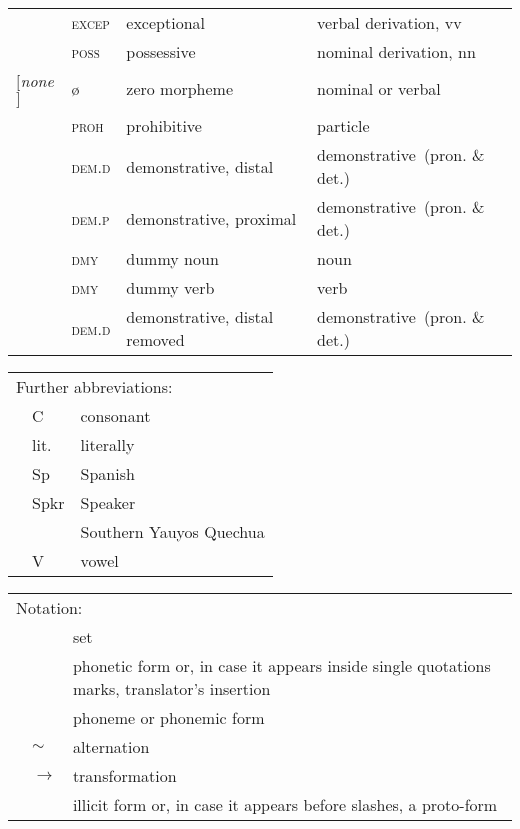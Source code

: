 \begin{refsection}
\begin{small}
\begin{longtable}{*{4}{@{\hspace{0.75ex}}l}@{\hspace{0ex}}}
 		& \textsc{excep} 	& exceptional 	& verbal derivation, vv\\
 		& \textsc{poss} 	& possessive 	& nominal derivation, nn\\
$[$\textit{none}$]$ 		& \o 			& zero morpheme 	& nominal or verbal\\
 		& \textsc{proh} 	& prohibitive 	& particle\\
 		& \textsc{dem.d} 	& demonstrative, distal 	& demonstrative~(pron. \&{} det.)\\
		& \textsc{dem.p} 	& demonstrative, proximal 	& demonstrative~(pron. \&{} det.) \\
		& \textsc{dmy} 	& dummy noun 	& noun\\
		& \textsc{dmy} 	& dummy verb 	& verb\\
		& \textsc{dem.d} 	& demonstrative, distal removed 	& demonstrative~(pron. \&{} det.)\\
\end{longtable}
\end{small}

\begin{small}
\begin{tabular}{p{\parindent}lp{}}
\multicolumn{3}{l}{Further abbreviations:}\\[1ex]
&C	&consonant		\\  
&lit. 	&literally		\\
&Sp	&Spanish		\\
&Spkr	&Speaker		\\
&\SYQ{} 	&Southern Yauyos Quechua\\
&V	&vowel			\\
\end{tabular}
\end{small}

\begin{small}
\begin{tabular}{p{\parindent}lp{}}
\multicolumn{3}{l}{Notation:}\\[1ex]
&\textipa{\{\textperiodcentered\}} 	& set\\
&\textipa{[{\textperiodcentered}]}	& phonetic form or, in case it appears inside single quotations marks, translator's insertion\\
&\textipa{/\textperiodcentered/}	& phoneme or phonemic form\\
&$\sim$ 				& alternation\\
&$\rightarrow $			& transformation\\
&\textipa{*}			& illicit form or, in case it appears before slashes, a proto-form\\
\end{tabular}
\end{small}



\end{refsection}
